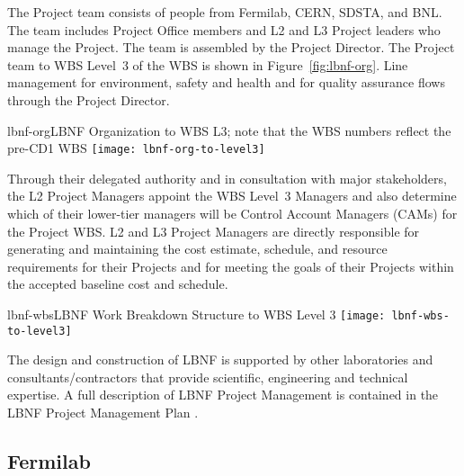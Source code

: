 The Project team consists of people from Fermilab, CERN, SDSTA, and BNL.  The team includes Project Office members and L2 and L3 Project leaders who manage the Project. The team is assembled by the Project Director. The Project team to WBS Level~3 of the WBS is shown in Figure~\ref{fig:lbnf-org}.   Line management for environment, safety and health and for quality assurance flows through the Project Director. 

\begin{cdrfigure}{lbnf-org}{LBNF Organization to WBS L3; note that the WBS numbers reflect the pre-CD1 WBS}
  \texttt{[image: lbnf-org-to-level3]}
\end{cdrfigure}

Through their delegated authority and in consultation with major stakeholders, the L2 Project Managers appoint the WBS Level~3 Managers and also determine which of their lower-tier managers will be Control Account Managers (CAMs) for the Project WBS. L2 and L3 Project Managers are directly responsible for generating and maintaining the cost estimate, schedule, and resource requirements for their Projects and for meeting the goals of their Projects within the accepted baseline cost and schedule. 


\begin{cdrfigure}{lbnf-wbs}{LBNF Work Breakdown Structure to WBS Level 3}
  \texttt{[image: lbnf-wbs-to-level3]}
\end{cdrfigure}

The design and construction of LBNF is supported by other laboratories and consultants/contractors that provide scientific, engineering and technical expertise. A full description of LBNF Project Management is contained in the LBNF Project Management Plan \fixme{[ref]}.

\subsection{Fermilab}


